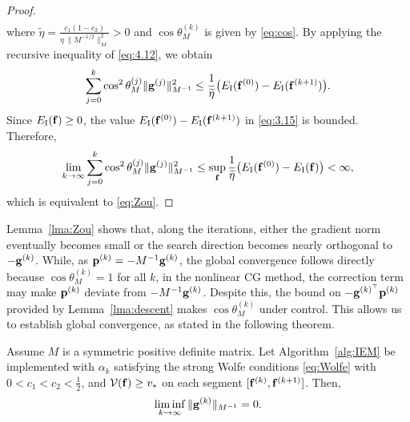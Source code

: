 \documentclass[11pt,a4paper]{article}
\begin{document}
\begin{proof}
\begin{align}
\end{align}
where $\widetilde\eta =\frac{c_1 (1-c_2)}{ \eta \, \|M^{-1/2}\|^2_{M}} > 0$ and $\cos\theta_M^{(k)}$ is given by \eqref{eq:cos}. 
By applying the recursive inequality of \eqref{eq:4.12}, we obtain
\begin{equation} \label{eq:3.15}
\sum_{j = 0}^{k} \cos^2 \theta_{M}^{(j)} \| {\mathbf{g}^{(j)}} \|_{M^{-1}}^2 \leq \frac{1}{\widetilde\eta}\big( E_\mathrm{I}({\mathbf{f}}^{(0)}) - E_\mathrm{I}({\mathbf{f}}^{(k+1)}) \big).
\end{equation}
Since $E_\mathrm{I}({\mathbf{f}}) \geq 0$, the value $E_\mathrm{I}({\mathbf{f}}^{(0)}) - E_\mathrm{I}({\mathbf{f}}^{(k+1)})$ in \eqref{eq:3.15} is bounded. Therefore,
$$
\lim_{k\to\infty} \sum_{j = 0}^{k} \cos^2 \theta_{M}^{(j)} \| {\mathbf{g}^{(j)}} \|_{M^{-1}}^2 \leq \sup_{\mathbf{f}} \frac{1}{\widetilde\eta}\big( E_\mathrm{I}({\mathbf{f}}^{(0)}) - E_\mathrm{I}({\mathbf{f}}) \big) < \infty,
$$
which is equivalent to \eqref{eq:Zou}.
\end{proof}


Lemma~\ref{lma:Zou} shows that, along the iterations, either the gradient norm eventually becomes small or the search direction becomes nearly orthogonal to $-\mathbf{g}^{(k)}$. While, as $\mathbf{p}^{(k)} = - M^{-1} {\mathbf{g}^{(k)}}$, the global convergence follows directly because $\cos \theta_M^{(k)} = 1$ for all $k$, in the nonlinear CG method, the correction term may make $\mathbf{p}^{(k)}$ deviate from $-M^{-1} \mathbf{g}^{(k)}$. Despite this, the bound on $-{\mathbf{g}^{(k)^\top}} \mathbf{p}^{(k)}$ provided by Lemma~\ref{lma:descent} makes $\cos\theta_M^{(k)}$ under control. This allows us to establish global convergence, as stated in the following theorem.


\begin{theorem} \label{thm:2}
Assume $M$ is a symmetric positive definite matrix. Let Algorithm~\ref{alg:IEM} be implemented with $\alpha_k$ satisfying the strong Wolfe conditions \eqref{eq:Wolfe} with $0<c_1<c_2<\frac{1}{2}$, and $\mathcal{V}(\mathbf{f}) \geq v_*$ on each segment $[\mathbf{f}^{(k)}, \mathbf{f}^{(k+1)}]$. 
Then,
\begin{equation} \label{eq:PCG_Convergence}
\liminf_{k \to \infty}{\| \mathbf{g}^{(k)} \|_{M^{-1}} } = 0.
\end{equation}
\end{theorem}
\end{document}
